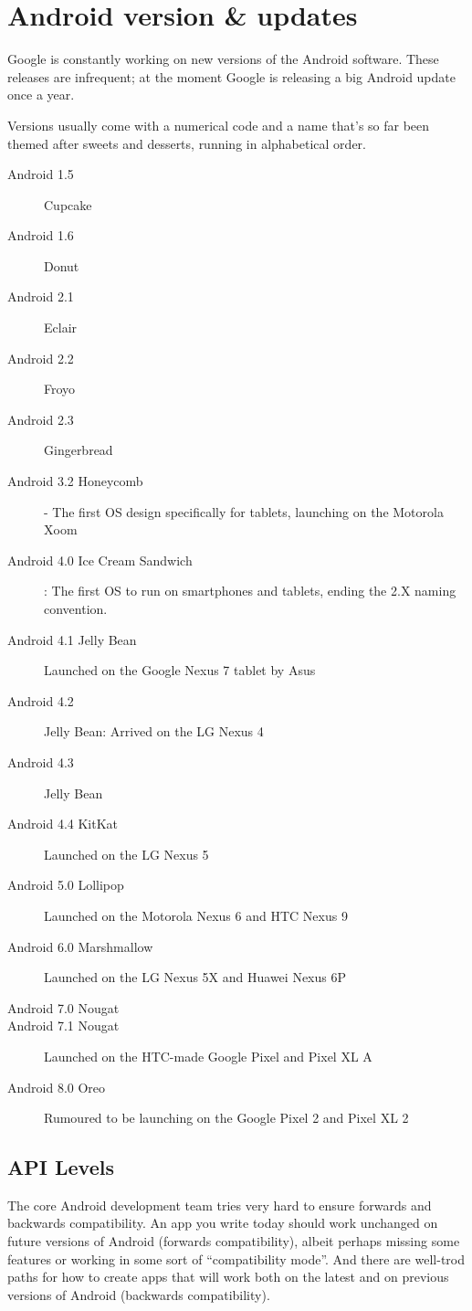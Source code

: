 \section{Android version \& updates}
Google is constantly working on new versions of the Android software. These releases are infrequent; at the moment Google is releasing a big Android update once a year.

Versions usually come with a numerical code and a name that’s so far been themed after sweets and desserts, running in alphabetical order.

\begin{description}
	\item[Android 1.5]  Cupcake
	\item[Android 1.6]  Donut
	\item[Android 2.1]  Eclair
	\item[Android 2.2]  Froyo
	\item[Android 2.3]  Gingerbread
	\item[Android 3.2 Honeycomb]  - The first OS design specifically for tablets, launching on the Motorola Xoom
	\item[Android 4.0 Ice Cream Sandwich] : The first OS to run on smartphones and tablets, ending the 2.X naming convention.
	\item[Android 4.1 Jelly Bean]  Launched on the Google Nexus 7 tablet by Asus
	\item[Android 4.2]  Jelly Bean: Arrived on the LG Nexus 4
	\item[Android 4.3]  Jelly Bean
	\item[Android 4.4 KitKat]  Launched on the LG Nexus 5
	\item[Android 5.0 Lollipop]  Launched on the Motorola Nexus 6 and HTC Nexus 9
	\item[Android 6.0 Marshmallow]  Launched on the LG Nexus 5X and Huawei Nexus 6P
	\item[Android 7.0 Nougat] 
	\item[Android 7.1 Nougat]  Launched on the HTC-made Google Pixel and Pixel XL
	A\item[Android 8.0 Oreo] Rumoured to be launching on the Google Pixel 2 and Pixel XL 2
\end{description}

\subsection{API Levels}
The core Android development team tries very hard to ensure forwards and backwards compatibility. An app you write today should work unchanged on future versions of Android (forwards compatibility), albeit perhaps missing some features or working in some sort of “compatibility mode”. And there are well-trod paths for how to create apps that will work both on the latest and on previous versions of Android (backwards compatibility).

